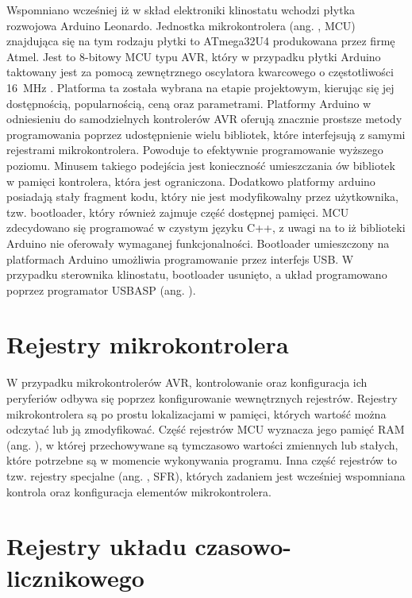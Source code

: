 Wspomniano wcześniej iż w skład elektroniki klinostatu wchodzi płytka rozwojowa Arduino Leonardo. Jednostka mikrokontrolera (ang. , MCU) znajdująca się na tym rodzaju płytki to ATmega32U4 produkowana przez firmę Atmel. Jest to 8-bitowy MCU typu AVR, który w przypadku płytki Arduino taktowany jest za pomocą zewnętrznego oscylatora kwarcowego o częstotliwości \SI{16}{MHz} \cite{bib:nota_katalogowa}. Platforma ta została wybrana na etapie projektowym, kierując się jej dostępnością, popularnością, ceną oraz parametrami. Platformy Arduino w odniesieniu do samodzielnych kontrolerów AVR oferują znacznie prostsze metody programowania poprzez udostępnienie wielu bibliotek, które interfejsują z samymi rejestrami mikrokontrolera. Powoduje to efektywnie programowanie wyższego poziomu. Minusem takiego podejścia jest konieczność umieszczania ów bibliotek w pamięci kontrolera, która jest ograniczona. Dodatkowo platformy arduino posiadają stały fragment kodu, który nie jest modyfikowalny przez użytkownika, tzw. bootloader, który również zajmuje część dostępnej pamięci. MCU zdecydowano się programować w czystym języku C++, z uwagi na to iż biblioteki Arduino nie oferowały wymaganej funkcjonalności. Bootloader umieszczony na platformach Arduino umożliwia programowanie przez interfejs USB. W przypadku sterownika klinostatu, bootloader usunięto, a układ programowano poprzez programator USBASP (ang. ).

\section{Rejestry mikrokontrolera}

W przypadku mikrokontrolerów AVR, kontrolowanie oraz konfiguracja ich peryferiów odbywa się poprzez konfigurowanie wewnętrznych rejestrów. Rejestry mikrokontrolera są po prostu lokalizacjami w pamięci, których wartość można odczytać lub ją zmodyfikować. Część rejestrów MCU wyznacza jego pamięć RAM (ang. ), w której przechowywane są tymczasowo wartości zmiennych lub stałych, które potrzebne są w momencie wykonywania programu. Inna część rejestrów to tzw. rejestry specjalne (ang. , SFR), których zadaniem jest wcześniej wspomniana kontrola oraz konfiguracja elementów mikrokontrolera.

\section{Rejestry układu czasowo-licznikowego}

